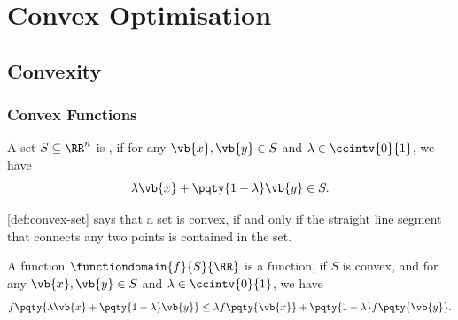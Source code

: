 \section{Convex Optimisation}

\subsection{Convexity}

\subsubsection{Convex Functions}

\begin{definition*}
    \label{def:convex-set}%
    A set \(S \subseteq \RR^n\) is , if for any \(\vb{x}, \vb{y} \in S\) and \(\lambda \in \ccintv{0}{1}\), we have
    \[
        \lambda \vb{x} + \pqty{1 - \lambda} \vb{y} \in S.
    \]
\end{definition*}

\autoref{def:convex-set} says that a set is convex, if and only if the straight line segment that connects any two points is contained in the set.

\begin{definition*}
    \label{def:convex-fn}%
    A function \(\functiondomain{f}{S}{\RR}\) is a  function, if \(S\) is convex, and for any \(\vb{x}, \vb{y} \in S\) and \(\lambda \in \ccintv{0}{1}\), we have
    \[
        f\pqty{\lambda \vb{x} + \pqty{1 - \lambda} \vb{y}} \leq \lambda f\pqty{\vb{x}} + \pqty{1 - \lambda} f\pqty{\vb{y}}.
    \]  
\end{definition*}

